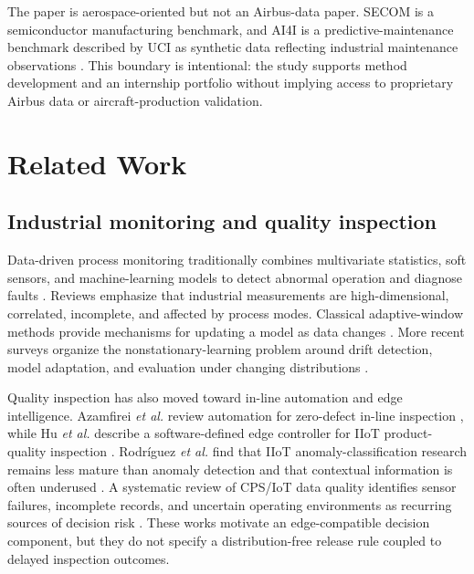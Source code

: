 \documentclass[journal]{IEEEtran}
\begin{document}
The paper is aerospace-oriented but not an Airbus-data paper. SECOM is a semiconductor manufacturing benchmark, and AI4I is a predictive-maintenance benchmark described by UCI as synthetic data reflecting industrial maintenance observations \cite{uci_secom,uci_ai4i}. This boundary is intentional: the study supports method development and an internship portfolio without implying access to proprietary Airbus data or aircraft-production validation.

\section{Related Work}
\label{sec:related}

\subsection{Industrial monitoring and quality inspection}
Data-driven process monitoring traditionally combines multivariate statistics, soft sensors, and machine-learning models to detect abnormal operation and diagnose faults \cite{qin2012,ge2017}. Reviews emphasize that industrial measurements are high-dimensional, correlated, incomplete, and affected by process modes. Classical adaptive-window methods provide mechanisms for updating a model as data changes \cite{bifet2007}. More recent surveys organize the nonstationary-learning problem around drift detection, model adaptation, and evaluation under changing distributions \cite{gama2014,ditzler2015,lu2019}.

Quality inspection has also moved toward in-line automation and edge intelligence. Azamfirei \emph{et al.} review automation for zero-defect in-line inspection \cite{azamfirei2023}, while Hu \emph{et al.} describe a software-defined edge controller for IIoT product-quality inspection \cite{hu2023}. Rodríguez \emph{et al.} find that IIoT anomaly-classification research remains less mature than anomaly detection and that contextual information is often underused \cite{rodriguez2023}. A systematic review of CPS/IoT data quality identifies sensor failures, incomplete records, and uncertain operating environments as recurring sources of decision risk \cite{goknil2023}. These works motivate an edge-compatible decision component, but they do not specify a distribution-free release rule coupled to delayed inspection outcomes.
\end{document}
